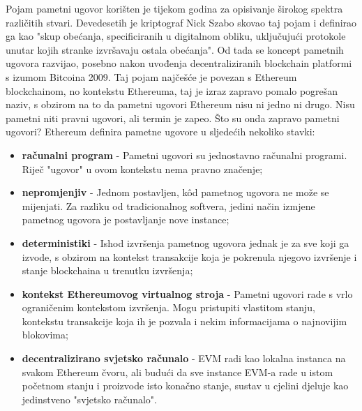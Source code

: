 \documentclass[times, utf8, diplomski]{fer}
\begin{document}
Pojam pametni ugovor korišten je tijekom godina za opisivanje širokog spektra različitih stvari. Devedesetih je kriptograf Nick Szabo skovao taj pojam i definirao ga kao "skup obećanja, specificiranih u digitalnom obliku, uključujući protokole unutar kojih stranke izvršavaju ostala obećanja". Od tada se koncept pametnih ugovora razvijao,  posebno nakon uvođenja decentraliziranih blockchain platformi s izumom Bitcoina 2009. Taj pojam najčešće je povezan s Ethereum blockchainom, no kontekstu Ethereuma, taj je izraz zapravo pomalo pogrešan naziv, s obzirom na to da pametni ugovori Ethereum nisu ni jedno ni drugo. Nisu pametni niti pravni ugovori, ali termin je zapeo.
Što su onda zapravo pametni ugovori? Ethereum definira pametne ugovore u sljedećih nekoliko stavki:

\begin{itemize}

\item \textbf{računalni program} - Pametni ugovori su jednostavno računalni programi. Riječ "ugovor" u ovom kontekstu nema pravno značenje;

\item \textbf{nepromjenjiv} - Jednom postavljen, kôd pametnog ugovora ne može se mijenjati. Za razliku od tradicionalnog softvera, jedini način izmjene pametnog ugovora je postavljanje nove instance;

\item \textbf{deterministiki} - Ishod izvršenja pametnog ugovora jednak je za sve koji ga izvode, s obzirom na kontekst transakcije koja je pokrenula njegovo izvršenje i stanje blockchaina u trenutku izvršenja;

\item \textbf{kontekst Ethereumovog virtualnog stroja} - Pametni ugovori rade s vrlo ograničenim kontekstom izvršenja. Mogu pristupiti vlastitom stanju, kontekstu transakcije koja ih je pozvala i nekim informacijama o najnovijim blokovima;

\item \textbf{decentralizirano svjetsko računalo} - EVM radi kao lokalna instanca na svakom Ethereum čvoru, ali budući da sve instance EVM-a rade u istom početnom stanju i proizvode isto konačno stanje, sustav u cjelini djeluje kao jedinstveno "svjetsko računalo".

\end{itemize}
\end{document}
